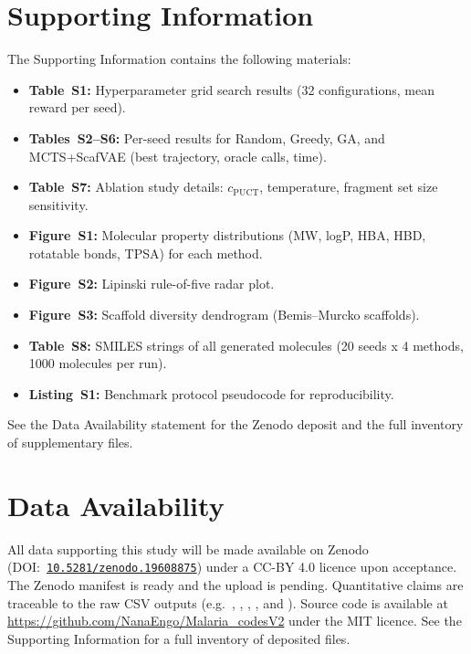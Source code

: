 \documentclass[jcim,article,layout=manuscript]{achemso}
\begin{document}
\section*{Supporting Information}
The Supporting Information contains the following materials:
\begin{itemize}[nosep]
  \item \textbf{Table~S1:} Hyperparameter grid search results
    (32 configurations, mean reward per seed).
  \item \textbf{Tables~S2--S6:} Per-seed results for Random, Greedy,
    GA, and MCTS+ScafVAE (best trajectory, oracle calls, time).
  \item \textbf{Table~S7:} Ablation study details: $c_{\text{PUCT}}$,
    temperature, fragment set size sensitivity.
  \item \textbf{Figure~S1:} Molecular property distributions (MW, logP,
    HBA, HBD, rotatable bonds, TPSA) for each method.
  \item \textbf{Figure~S2:} Lipinski rule-of-five radar plot.
  \item \textbf{Figure~S3:} Scaffold diversity dendrogram (Bemis--Murcko
    scaffolds).
  \item \textbf{Table~S8:} SMILES strings of all generated molecules
    (20 seeds x 4 methods, 1000 molecules per run).
  \item \textbf{Listing~S1:} Benchmark protocol pseudocode for
    reproducibility.
\end{itemize}
See the Data Availability statement for the Zenodo deposit and the full
inventory of supplementary files.

\section*{Data Availability}
All data supporting this study will be made available on Zenodo
(DOI:~\href{https://doi.org/10.5281/zenodo.19608875}{\nolinkurl{10.5281/zenodo.19608875}})
under a CC-BY 4.0 licence upon acceptance. The Zenodo manifest is ready
and the upload is pending. Quantitative claims are traceable to the raw
CSV outputs (e.g.~,
,
,
, and
). Source code is available at
\url{https://github.com/NanaEngo/Malaria_codesV2} under the MIT licence.
See the Supporting Information for a full inventory of deposited files.
\end{document}

